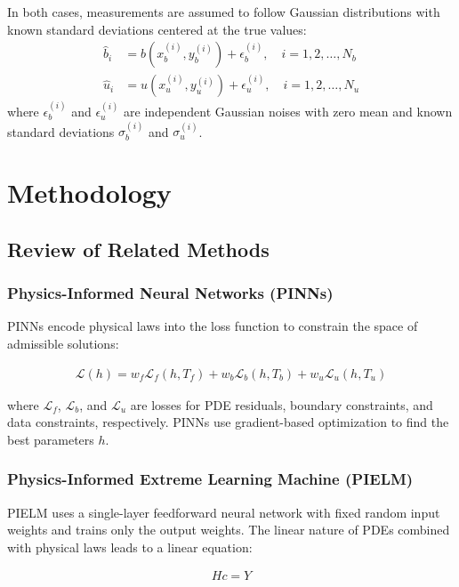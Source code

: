 \documentclass[11pt]{article}
\begin{document}
In both cases, measurements are assumed to follow Gaussian distributions with known standard deviations centered at the true values:
\begin{align}
    \hat{b}_i &= b(x_b^{(i)}, y_b^{(i)}) + \epsilon_b^{(i)}, \quad i = 1, 2, \ldots, N_b \\
    \hat{u}_i &= u(x_u^{(i)}, y_u^{(i)}) + \epsilon_u^{(i)}, \quad i = 1, 2, \ldots, N_u
\end{align}
where $\epsilon_b^{(i)}$ and $\epsilon_u^{(i)}$ are independent Gaussian noises with zero mean and known standard deviations $\sigma_b^{(i)}$ and $\sigma_u^{(i)}$.

\section{Methodology}

\subsection{Review of Related Methods}

\subsubsection{Physics-Informed Neural Networks (PINNs)}

PINNs encode physical laws into the loss function to constrain the space of admissible solutions:

\begin{align}
    \mathcal{L}(h) = w_f\mathcal{L}_f(h, T_f) + w_b\mathcal{L}_b(h, T_b) + w_u\mathcal{L}_u(h, T_u)
\end{align}

where $\mathcal{L}_f$, $\mathcal{L}_b$, and $\mathcal{L}_u$ are losses for PDE residuals, boundary constraints, and data constraints, respectively. PINNs use gradient-based optimization to find the best parameters $h$.

\subsubsection{Physics-Informed Extreme Learning Machine (PIELM)}

PIELM uses a single-layer feedforward neural network with fixed random input weights and trains only the output weights. The linear nature of PDEs combined with physical laws leads to a linear equation:

\begin{align}
    Hc = Y
\end{align}
\end{document}
